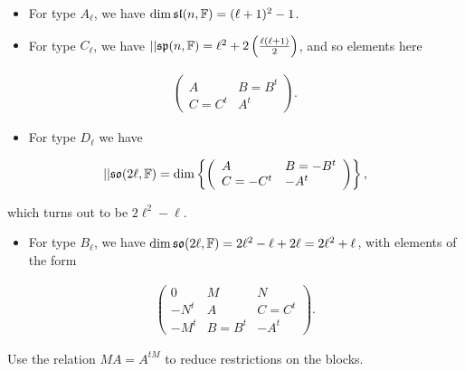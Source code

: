 \begin{itemize}
\item
  For type \(A_{\ell}\), we have
  \(\dim {\mathfrak{sl}}(n, {\mathbb{F}}) = (\ell+1)^{2} - 1\).
\item
  For type \(C_{\ell}\), we have
  \({\left\lvert {} \right\rvert}{{\mathfrak{sp}}(n, {\mathbb{F}})} = \ell^{2} + 2\left(\frac{\ell(\ell+1)}{2} \right )\),
  and so elements here
\end{itemize}

\begin{align*}
\left(\begin{array}{ll}
{A} & {B=B^{t}} \\ 
{C = C^{t}} & {A^{t}}
\end{array}\right)
.\end{align*}


\begin{itemize}
\tightlist
\item
  For type \(D_{\ell}\) we have
\end{itemize}

\begin{align*}
{\left\lvert {} \right\rvert}{{\mathfrak{so}}(2\ell, {\mathbb{F}})}
= \dim\left\{{ 
\left(\begin{array}{ll}{A}
 & {B=-B^{t}} \\ 
{C = -C^{t}} & {-A^{t}}
\end{array}\right)}\right\}
,\end{align*}

which turns out to be \(2\ell^{2}-\ell\).

\begin{itemize}
\tightlist
\item
  For type \(B_{\ell}\), we have
  \(\dim{{\mathfrak{so}}}(2\ell, {\mathbb{F}}) = 2\ell^{2} -\ell+2\ell = 2\ell^{2} + \ell\),
  with elements of the form
\end{itemize}

\begin{align*}
\left(\begin{array}{c|cc}
0 & M & N \\ \hline
-N^{t} & A & C=C^{t} \\
-M^{t} & B=B^{t} & -A^{t}
\end{array}\right)
.\end{align*}


Use the relation \(MA = A^{tM}\) to reduce restrictions on the blocks.


